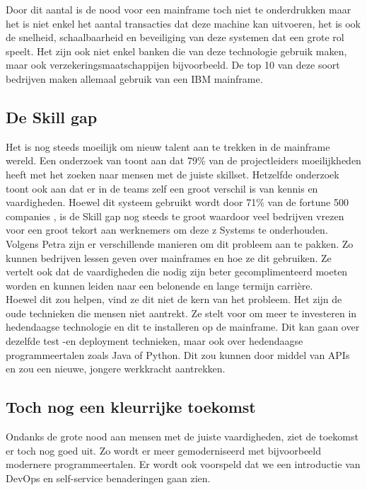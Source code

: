 Door dit aantal is de nood voor een mainframe toch niet te onderdrukken maar het is niet enkel het aantal transacties dat deze machine kan uitvoeren, het is ook de snelheid, schaalbaarheid en beveiliging van deze systemen dat een grote rol speelt. Het zijn ook niet enkel banken die van deze technologie gebruik maken, maar ook  verzekeringsmaatschappijen bijvoorbeeld. De top 10 van deze soort bedrijven maken allemaal gebruik van een IBM mainframe. \autocite{Tozzi2022}

\subsection{De Skill gap}
Het is nog steeds moeilijk om nieuw talent aan te trekken in de mainframe wereld. Een onderzoek van \textcite{Deloitte2020} toont aan dat 79\% van de projectleiders moeilijkheden heeft met het zoeken naar mensen met de juiste skillset. Hetzelfde onderzoek toont ook aan dat er in de teams zelf een groot verschil is van kennis en vaardigheden. Hoewel dit systeem gebruikt wordt door 71\% van de fortune 500 companies \autocite{Tozzi2022} , is de Skill gap nog steeds te groot waardoor veel bedrijven vrezen voor een groot tekort aan werknemers om deze z Systems te onderhouden. \\

Volgens Petra \textcite{Goude2023} zijn er verschillende manieren om dit probleem aan te pakken. Zo kunnen bedrijven lessen geven over mainframes en hoe ze dit gebruiken. Ze vertelt ook dat de vaardigheden die nodig zijn beter gecomplimenteerd moeten worden en kunnen leiden naar een belonende en lange termijn carrière. \\ 

Hoewel dit zou helpen, vind ze dit niet de kern van het probleem. Het zijn de oude technieken die mensen niet aantrekt. Ze stelt voor om meer te investeren in hedendaagse technologie en dit te installeren op de mainframe. Dit kan gaan over dezelfde test -en deployment technieken, maar ook over hedendaagse programmeertalen zoals Java of Python. Dit zou kunnen door middel van APIs en zou een nieuwe, jongere werkkracht aantrekken. \autocite{Goude2023}


\subsection{Toch nog een kleurrijke toekomst}
Ondanks de grote nood aan mensen met de juiste vaardigheden, ziet de toekomst er toch nog goed uit. Zo wordt er meer gemoderniseerd met bijvoorbeeld modernere programmeertalen. Er wordt ook voorspeld dat we een introductie van DevOps en self-service benaderingen gaan zien. \autocite{Pennaz2023} \\

